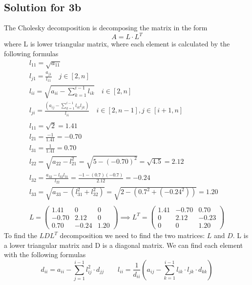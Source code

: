 \documentclass[a4paper,fleqn,12pt]{article}
\begin{document}
\subsection{Solution for 3b}
The Cholesky decomposition is decomposing the matrix in the form 
$$
A = L \cdot L^T
$$
where L is lower triangular matrix, where each element is calculated by the following formulas
\begin{gather*}
l_{11} = \sqrt{a_{11}}   \\
l_{j1} = \frac{a_{j1}}{l_{11}} \quad  j \in [2, n] \\
l_{ii} = \sqrt{a_{ii} - \sum_{k=1} ^{i-1} l_{ik}} \quad i \in [2, n] \\
l_{ji} = \frac{ \left( a_{ij} - \sum_{k=1} ^{i-1} l_{ik} l_{jk} \right)}{l_{ii}} \quad i \in [2, n-1], j \in [i+1, n] \\
\\
l_{11} = \sqrt{2} = 1.41 \\
l_{21} = \frac{-1}{1.41} = - 0.70 \\
l_{31} = \frac{1}{1.41}  = 0.70 \\
l_{22} = \sqrt{a_{22} - l_{21} ^2} = \sqrt{5 - (-0.70)^2} = \sqrt{4.5} = 2.12 \\
l_{32} = \frac{a_{32} - l_{32}l_{31}}{l_{22}} = \frac{-1 -(0.7)(-0.7)}{2.12} = -0.24 \\
l_{33} = \sqrt{a_{33} - (l_{31} ^2 + l_{32} ^2)} = \sqrt{2 - (0.7^2 + (-0.24^2))} = 1.20\\
\\
L = 
\begin{pmatrix}
1.41 & 0 & 0 \\
-0.70 & 2.12 & 0 \\
0.70 & -0.24 & 1.20 
\end{pmatrix} \implies  
L^T = \begin{pmatrix}
1.41 & -0.70 & 0.70 \\
0 & 2.12 & -0.23 \\
0 & 0 & 1.20
\end{pmatrix}
\end{gather*}
\newpage
To find the $LDL^T$ decomposition we need to find the two matrices: $L$ and $D$.
L is a lower triangular matrix and D is a diagonal matrix.
We can find each element with the following formulas
$$
d_{ii} = a_{ii} - \sum_{j=1} ^{i-1} l_{ij} ^2 \cdot d_{jj} \qquad
l_{ii} = \frac{1}{d_{ii}} \left( a_{ij} - \sum_{k=1} ^{i-1} l_{ik}\cdot l_{jk}\cdot d_{kk} \right)  
$$
\end{document}
